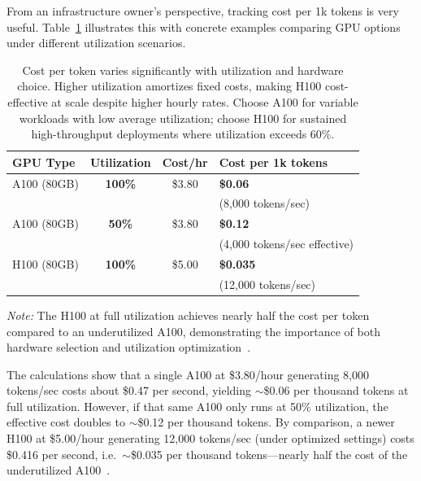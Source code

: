 From an infrastructure owner's perspective, tracking cost per 1k tokens is very useful. Table~\ref{tab:ch03_cost_per_token} illustrates this with concrete examples comparing GPU options under different utilization scenarios.

\begin{table}[t]
  \centering
  \small
  \caption{Cost per token varies significantly with utilization and hardware choice. Higher utilization amortizes fixed costs, making H100 cost-effective at scale despite higher hourly rates. Choose A100 for variable workloads with low average utilization; choose H100 for sustained high-throughput deployments where utilization exceeds 60\%.}
  \label{tab:ch03_cost_per_token}
  \setlength{\tabcolsep}{6pt}
  \renewcommand{\arraystretch}{1.3}
  \begin{tabularx}{\linewidth}{@{}lccX@{}}
    \toprule
    \rowcolor{gray!15}
    \textbf{GPU Type} & \textbf{Utilization} & \textbf{Cost/hr} & \textbf{Cost per 1k tokens} \\
    \midrule
    \rowcolor{blue!8}
    A100 (80GB) & \textcolor{green!70!black}{\textbf{100\%}} & \$3.80 & \textcolor{blue!70!black}{\textbf{\$0.06}} \\
    & & & \footnotesize (8,000 tokens/sec) \\
    \addlinespace[2pt]
    \rowcolor{orange!12}
    A100 (80GB) & \textcolor{orange!70!black}{\textbf{50\%}} & \$3.80 & \textcolor{red!70!black}{\textbf{\$0.12}} \\
    & & & \footnotesize (4,000 tokens/sec effective) \\
    \addlinespace[2pt]
    \rowcolor{green!10}
    H100 (80GB) & \textcolor{green!70!black}{\textbf{100\%}} & \$5.00 & \textcolor{green!70!black}{\textbf{\$0.035}} \\
    & & & \footnotesize (12,000 tokens/sec) \\
    \bottomrule
  \end{tabularx}
  \vspace{3pt}
  \footnotesize
  \textit{Note:} The H100 at full utilization achieves nearly half the cost per token compared to an underutilized A100, demonstrating the importance of both hardware selection and utilization optimization~\cite{fabricatedknowledge,lambda}.
\end{table}

The calculations show that a single A100 at \$3.80/hour generating 8,000 tokens/sec costs about \$0.47 per second, yielding $\sim$\$0.06 per thousand tokens at full utilization. However, if that same A100 only runs at 50\% utilization, the effective cost doubles to $\sim$\$0.12 per thousand tokens. By comparison, a newer H100 at \$5.00/hour generating 12,000 tokens/sec (under optimized settings) costs \$0.416 per second, i.e.\ $\sim$\$0.035 per thousand tokens---nearly half the cost of the underutilized A100~\cite{fabricatedknowledge,lambda}. 

